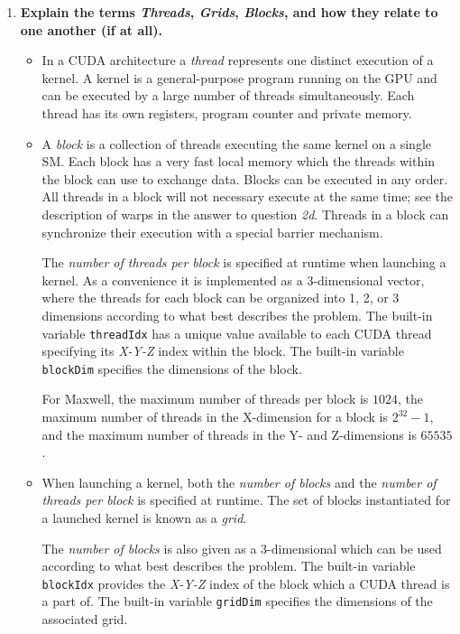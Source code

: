 \begin{enumerate}

\item \textbf{Explain the terms \textit{Threads}, \textit{Grids}, \textit{Blocks}, and how they relate to one another (if at all).}

\begin{itemize}

\item In a \ac{CUDA} architecture a \textit{thread} represents one distinct execution of a kernel. A kernel is a general-purpose program running on the \ac{GPU} and can be executed by a large number of threads simultaneously. Each thread has its own registers, program counter and private memory. 

\item A \textit{block} is a collection of threads executing the same kernel on a single \ac{SM}. Each block has a very fast local memory which the threads within the block can use to exchange data. Blocks can be executed in any order. All threads in a block will not necessary execute at the same time; see the description of warps in the answer to question \textit{2d}. Threads in a block can synchronize their execution with a special barrier mechanism.

The \textit{number of threads per block} is specified at runtime when launching a kernel. As a convenience it is implemented as a 3-dimensional vector, where the threads for each block can be organized into 1, 2, or 3 dimensions according to what best describes the problem. The built-in variable \texttt{threadIdx} has a unique value available to each \ac{CUDA} thread specifying its \textit{X-Y-Z} index within the block. The built-in variable \texttt{blockDim} specifies the dimensions of the block.

For Maxwell, the maximum number of threads per block is $1024$, the maximum number of threads in the X-dimension for a block is $2^{32}-1$, and the maximum number of threads in the Y- and Z-dimensions is $65535$.

\item When launching a kernel, both the \textit{number of blocks} and the \textit{number of threads per block} is specified at runtime. The set of blocks instantiated for a launched kernel is known as a \textit{grid}.

The \textit{number of blocks} is also given as a 3-dimensional which can be used according to what best describes the problem. The built-in variable \texttt{blockIdx} provides the \textit{X-Y-Z} index of the block which a \ac{CUDA} thread is a part of. The built-in variable \texttt{gridDim} specifies the dimensions of the associated grid.


\end{itemize}
\end{enumerate}
